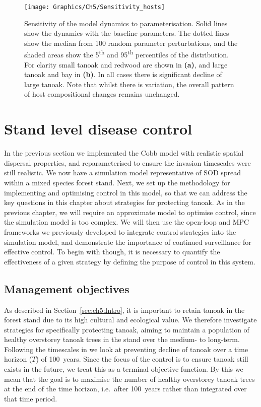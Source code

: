 \begin{figure}[b]
    \begin{center}
        \texttt{[image: Graphics/Ch5/Sensitivity\_hosts]}
        \caption[Sensitivity of model dynamics]{Sensitivity of the model dynamics to parameterisation. Solid lines show the dynamics with the baseline parameters. The dotted lines show the median from 100 random parameter perturbations, and the shaded areas show the 5\textsuperscript{th} and 95\textsuperscript{th} percentiles of the distribution. For clarity small tanoak and redwood are shown in \textbf{(a)}, and large tanoak and bay in \textbf{(b)}. In all cases there is significant decline of large tanoak. Note that whilst there is variation, the overall pattern of host compositional changes remains unchanged.\label{fig:ch5:model_sensitivity}}
    \end{center}
\end{figure}
\FloatBarrier{}

\section{Stand level disease control\label{sec:ch5:control}}

In the previous section we implemented the Cobb model with realistic spatial dispersal properties, and reparameterised to ensure the invasion timescales were still realistic. We now have a simulation model representative of SOD spread within a mixed species forest stand. Next, we set up the methodology for implementing and optimising control in this model, so that we can address the key questions in this chapter about strategies for protecting tanoak. As in the previous chapter, we will require an approximate model to optimise control, since the simulation model is too complex. We will then use the open-loop and MPC frameworks we previously developed to integrate control strategies into the simulation model, and demonstrate the importance of continued surveillance for effective control. To begin with though, it is necessary to quantify the effectiveness of a given strategy by defining the purpose of control in this system.

\subsection{Management objectives}\label{sec:ch5:mgmt_objs}

As described in Section~\ref{sec:ch5:Intro}, it is important to retain tanoak in the forest stand due to its high cultural and ecological value. We therefore investigate strategies for specifically protecting tanoak, aiming to maintain a population of healthy overstorey tanoak trees in the stand over the medium- to long-term. Following the timescales in \citet{cobb_ecosystem_2012} we look at preventing decline of tanoak over a time horizon ($T$) of 100~years. Since the focus of the control is to ensure tanoak still exists in the future, we treat this as a terminal objective function. By this we mean that the goal is to maximise the number of healthy overstorey tanoak trees at the end of the time horizon, i.e.\ after 100~years rather than integrated over that time period.

